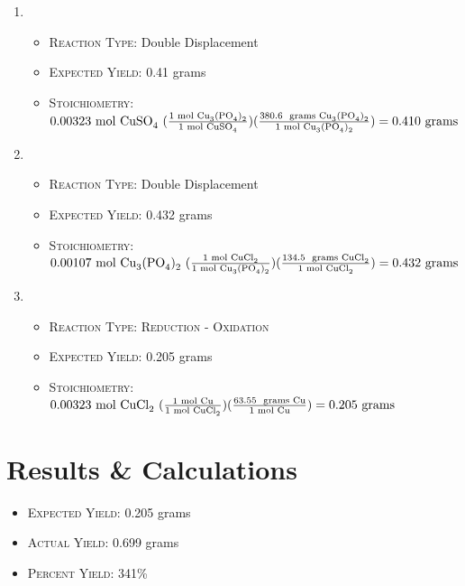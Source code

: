 \documentclass[11pt,letterpaper]{report}
\begin{document}
\begin{enumerate}
\item {}
\begin{itemize}
\item \textsc{Reaction Type:} Double Displacement
\item \textsc{Expected Yield:} 0.41 grams
\item \textsc{Stoichiometry:} $0.00323 \text{ mol \ce{CuSO4} } ( \frac{\text{1 mol \ce{Cu3(PO4)2}}}{\text{1 mol \ce{CuSO4}}} ) ( \frac{\text{380.6 \text{ grams} \ce{Cu3(PO4)2}}}{\text{1 mol \ce{Cu3(PO4)2}}} ) = 0.410 \text{ grams}$
\end{itemize}
\item {}
\begin{itemize}
\item \textsc{Reaction Type:} Double Displacement
\item \textsc{Expected Yield:} 0.432 grams
\item \textsc{Stoichiometry:}  $0.00107 \text{ mol \ce{Cu3(PO4)2} } ( \frac{\text{1 mol \ce{CuCl2}}}{\text{1 mol \ce{Cu3(PO4)2}}} ) ( \frac{\text{134.5 \text{ grams} \ce{CuCl2}}}{\text{1 mol \ce{CuCl2}}} ) = 0.432 \text{ grams}$
\end{itemize}
\item {}\\
\begin{itemize}
\item \textsc{Reaction Type: Reduction - Oxidation} 
\item \textsc{Expected Yield:} 0.205 grams
\item \textsc{Stoichiometry:} $0.00323 \text{ mol \ce{CuCl2} } ( \frac{\text{1 mol \ce{Cu}}}{\text{1 mol \ce{CuCl2}}} ) ( \frac{\text{63.55 \text{ grams} \ce{Cu}}}{\text{1 mol \ce{Cu}}} ) = 0.205 \text{ grams}$
\end{itemize}
\end{enumerate}

\section*{Results \& Calculations}
\begin{itemize}
\item \textsc{Expected Yield:} 0.205 grams
\item \textsc{Actual Yield:} 0.699 grams
\item \textsc{Percent Yield:} 341\%
\end{itemize}
\end{document}
